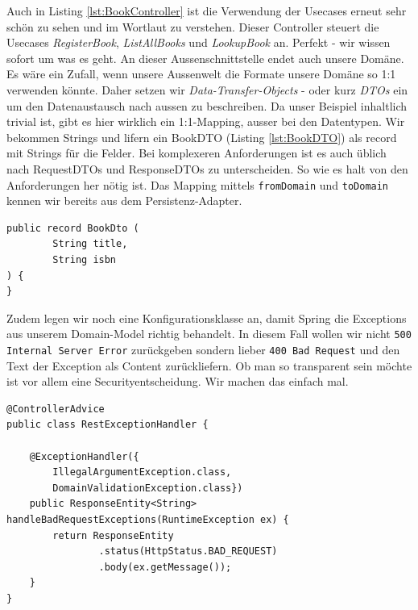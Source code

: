 Auch in Listing \ref{lst:BookController} ist die Verwendung der Usecases
erneut sehr schön zu sehen und im Wortlaut zu verstehen. Dieser Controller
steuert die Usecases \textit{RegisterBook}, \textit{ListAllBooks} und
\textit{LookupBook} an. Perfekt - wir wissen sofort um was es geht. An 
dieser Aussenschnittstelle endet auch unsere Domäne. Es wäre ein Zufall,
wenn unsere Aussenwelt die Formate unsere Domäne so 1:1 verwenden könnte.
Daher setzen wir \textit{Data-Transfer-Objects} - oder kurz \textit{DTOs}
ein um den Datenaustausch nach aussen zu beschreiben. Da unser Beispiel
inhaltlich trivial ist, gibt es hier wirklich ein 1:1-Mapping, ausser bei den
Datentypen. Wir bekommen Strings und lifern ein BookDTO 
(Listing \ref{lst:BookDTO}) als record mit Strings
für die Felder. Bei komplexeren Anforderungen ist es auch üblich nach
RequestDTOs und ResponseDTOs zu unterscheiden. So wie es halt von den
Anforderungen her nötig ist. Das Mapping mittels \texttt{fromDomain}
und \texttt{toDomain} kennen wir bereits aus dem Persistenz-Adapter.

\begin{listing}[H]
\begin{verbatim}
public record BookDto (
        String title,
        String isbn
) {
}
\end{verbatim}
\caption{BookDTO.java}
\label{lst:BookDTO}
\end{listing}


Zudem legen wir noch eine Konfigurationsklasse an, damit Spring die Exceptions
aus unserem Domain-Model richtig behandelt. In diesem Fall wollen wir nicht
\texttt{500 Internal Server Error} zurückgeben sondern lieber 
\texttt{400 Bad Request} und den Text der Exception als Content zurückliefern.
Ob man so transparent sein möchte ist vor allem eine Securityentscheidung.
Wir machen das einfach mal.

\begin{listing}[H]
\begin{verbatim}
@ControllerAdvice
public class RestExceptionHandler {

    @ExceptionHandler({
        IllegalArgumentException.class,  
        DomainValidationException.class})
    public ResponseEntity<String> handleBadRequestExceptions(RuntimeException ex) {
        return ResponseEntity
                .status(HttpStatus.BAD_REQUEST)
                .body(ex.getMessage());
    }
}
\end{verbatim}
\caption{Konfiguration um Exceptions richtig zu behandeln}
\label{lst:RestExceptionHandler}
\end{listing}

